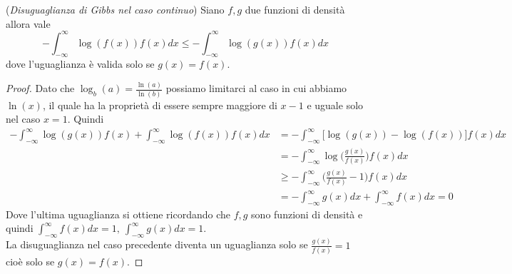 \begin{teo}\label{teo:GibbsContinuo}(\textit{Disuguaglianza di Gibbs nel caso continuo})
Siano $f,g$ due funzioni di densità allora vale
\begin{equation}
-\int_{-\infty}^{\infty} \log(f(x))f(x)dx \leq - \int_{-\infty}^{\infty} \log(g(x))f(x)dx
\end{equation}
dove l'uguaglianza è valida solo se $g(x)=f(x)$.
\end{teo}
\begin{proof}
Dato che $\log_b(a)=\frac{\ln (a)}{\ln (b)}$ possiamo limitarci al caso in cui abbiamo $\ln(x)$, il quale ha la proprietà di essere sempre maggiore di $x-1$ e uguale solo nel caso $x=1$. Quindi
\[
\begin{split}
- \int_{-\infty}^{\infty} \log(g(x))f(x) +  \int_{-\infty}^{\infty} \log(f(x))f(x)dx & = - \int_{-\infty}^{\infty} \bigg[\log(g(x))-\log(f(x))\bigg] f(x)dx \\
& =-\int_{-\infty}^{\infty} \log \bigg(\frac{g(x)}{f(x)}\bigg)f(x)dx\\
& \geq  -\int_{-\infty}^{\infty} \bigg(\frac{g(x)}{f(x)} -1\bigg)f(x)dx\\
&= -\int_{-\infty}^{\infty} g(x)dx +\int_{-\infty}^{\infty} f(x)dx=0
\end{split}
\]
Dove l'ultima uguaglianza si ottiene ricordando che $f,g$ sono funzioni di densità e quindi $\int_{-\infty}^{\infty} f(x)dx=1, \ \int_{-\infty}^{\infty} g(x)dx=1$.\\
La disuguaglianza nel caso precedente diventa un uguaglianza solo se $\frac{g(x)}{f(x)}=1$ cioè solo se $g(x)=f(x)$.
\end{proof}


